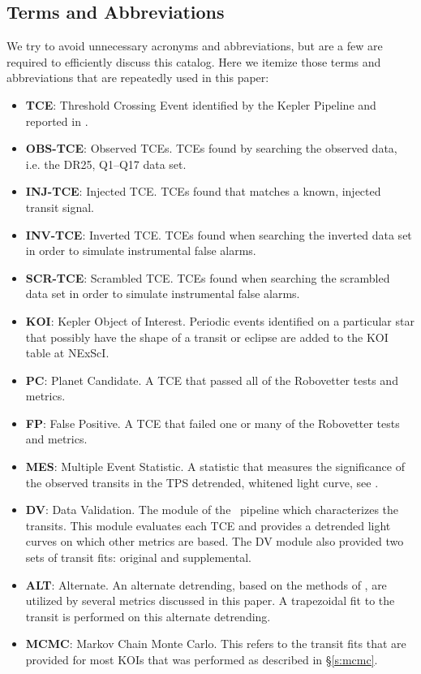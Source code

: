 \subsection{Terms and Abbreviations}
\label{abbrev}
We try to avoid unnecessary acronyms and abbreviations, but are a few are required to efficiently discuss this catalog.  Here we itemize those terms and abbreviations that are repeatedly used in this paper:

\begin{itemize}
\item[] \textbf{TCE}: Threshold Crossing Event identified by the Kepler Pipeline and reported in \citet{Twicken2016}.
\item[] \textbf{OBS-TCE}: Observed TCEs. TCEs found by searching the observed data, i.e. the DR25, Q1--Q17 data set.
\item[] \textbf{INJ-TCE}: Injected TCE. TCEs found that matches a known, injected transit signal.
\item[] \textbf{INV-TCE}: Inverted TCE. TCEs found when searching the inverted data set in order to simulate instrumental false alarms.
\item[] \textbf{SCR-TCE}: Scrambled TCE. TCEs found when searching the scrambled data set in order to simulate instrumental false alarms.
\item[] \textbf{KOI}: Kepler Object of Interest. Periodic events identified on a particular star that possibly have the shape of a transit or eclipse are added to the KOI table at NExScI. 
\item[] \textbf{PC}: Planet Candidate. A TCE that passed all of the Robovetter tests and metrics.
\item[] \textbf{FP}: False Positive. A TCE that failed one or many of the Robovetter tests and metrics.
\item[] \textbf{MES}: Multiple Event Statistic. A statistic that measures the significance of the observed transits in the TPS detrended, whitened light curve, see \citep{Jenkins2002a}.
\item[] \textbf{DV}: Data Validation. The module of the \Kepler\ pipeline which characterizes the transits. This module evaluates each TCE and provides a detrended light curves on which other metrics are based. The DV module also provided two sets of transit fits: original and supplemental.
\item[] \textbf{ALT}: Alternate. An alternate detrending, based on the methods of \citet{Garcia2010}, are utilized by several metrics discussed in this paper. A trapezoidal fit to the transit is performed on this alternate detrending.
\item[] \textbf{MCMC}: Markov Chain Monte Carlo. This refers to the transit fits that are provided for most KOIs that was performed as described in \S\ref{s:mcmc}.

\end{itemize}
